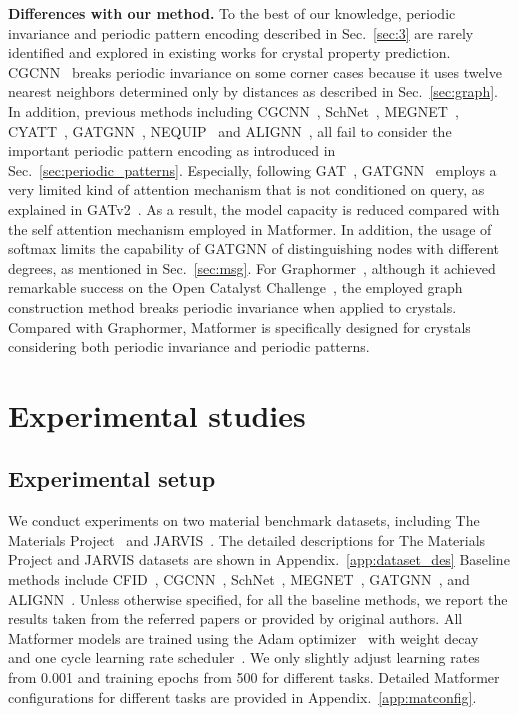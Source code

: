 \documentclass{article}
\begin{document}
\textbf{Differences with our method.} To the best of our knowledge, periodic invariance and periodic pattern encoding described in Sec.~\ref{sec:3} are rarely identified and explored in existing works for crystal property prediction. CGCNN~\citep{cgcnn} breaks periodic invariance on some corner cases because it uses twelve nearest neighbors determined only by distances as described in Sec.~\ref{sec:graph}. In addition, previous methods including CGCNN~\citep{cgcnn}, SchNet~\citep{schnet}, MEGNET~\citep{megnet}, CYATT~\citep{cyatt}, GATGNN~\citep{gatgnn}, NEQUIP~\citep{nequip} and ALIGNN~\citep{alignn}, all fail to consider the important periodic pattern encoding as introduced in Sec.~\ref{sec:periodic_patterns}. Especially, following GAT~\citep{gat_velivckovic2018graph}, GATGNN~\citep{gatgnn} employs a very limited kind of attention mechanism that is not conditioned on query, as explained in GATv2~\citep{gatv2}. As a result, the model capacity is reduced compared with the self attention mechanism employed in Matformer. In addition, the usage of softmax limits the capability of GATGNN of distinguishing nodes with different degrees, as mentioned in Sec.~\ref{sec:msg}.
For Graphormer~\citep{graphormer}, although it achieved remarkable success on the Open Catalyst Challenge~\citep{ocp_dataset}, the employed graph construction method breaks periodic invariance when applied to crystals. Compared with Graphormer, Matformer is specifically designed for crystals considering both periodic invariance and periodic patterns.





















\section{Experimental studies}
\subsection{Experimental setup}
We conduct experiments on two material benchmark datasets, including The Materials Project~\citep{jain2013commentary} and JARVIS~\citep{choudhary2020joint}. The detailed descriptions for The Materials Project and JARVIS datasets are shown in Appendix.~\ref{app:dataset_des} Baseline methods include CFID~\citep{cfid}, CGCNN~\citep{cgcnn}, SchNet~\citep{schnet}, MEGNET~\citep{megnet}, GATGNN~\citep{gatgnn}, and ALIGNN~\citep{alignn}. Unless otherwise specified, for all the baseline methods, we report the results taken from the referred papers or provided by original authors. 
All Matformer models are trained using the Adam optimizer~\citep{kingma2015adam} with weight decay~\citep{weightdecay} and one cycle learning rate scheduler~\citep{onecycle}. We only slightly adjust learning rates from 0.001 and training epochs from 500 for different tasks. Detailed Matformer configurations for different tasks are provided in Appendix.~\ref{app:matconfig}. 
\end{document}

